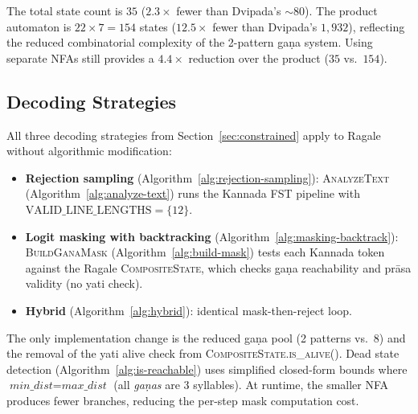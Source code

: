 \documentclass[11pt]{article}
\begin{document}
The total state count is $35$ ($2.3\times$ fewer than Dvipada's $\sim$80).
The product automaton is $22 \times 7 = 154$ states ($12.5\times$ fewer
than Dvipada's $1{,}932$), reflecting the reduced combinatorial complexity
of the 2-pattern ga\d{n}a system. Using separate NFAs still provides a
$4.4\times$ reduction over the product ($35$ vs.\ $154$).

\subsection{Decoding Strategies}

All three decoding strategies from Section~\ref{sec:constrained} apply to
Ragale without algorithmic modification:

\begin{itemize}
\item \textbf{Rejection sampling}
  (Algorithm~\ref{alg:rejection-sampling}): \textsc{AnalyzeText}
  (Algorithm~\ref{alg:analyze-text}) runs the Kannada FST pipeline
  with $\text{VALID\_LINE\_LENGTHS} = \{12\}$.
\item \textbf{Logit masking with backtracking}
  (Algorithm~\ref{alg:masking-backtrack}): \textsc{BuildGanaMask}
  (Algorithm~\ref{alg:build-mask}) tests each Kannada token against
  the Ragale \textsc{CompositeState}, which checks ga\d{n}a reachability
  and pr\=asa validity (no yati check).
\item \textbf{Hybrid} (Algorithm~\ref{alg:hybrid}): identical
  mask-then-reject loop.
\end{itemize}

The only implementation change is the reduced ga\d{n}a pool (2 patterns
vs.\ 8) and the removal of the yati alive check from
\textsc{CompositeState.is\_alive()}. Dead state detection
(Algorithm~\ref{alg:is-reachable}) uses simplified closed-form bounds
where $\textit{min\_dist} = \textit{max\_dist}$ (all \textit{ga\d{n}as} are 3
syllables). At runtime, the smaller NFA produces fewer branches,
reducing the per-step mask computation cost.
\end{document}
